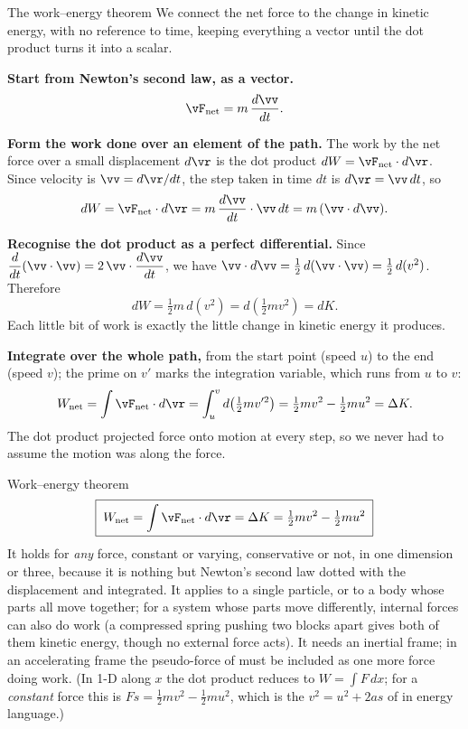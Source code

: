 \begin{derivbox}{The work--energy theorem}
We connect the net force to the change in kinetic energy, with no reference to time, keeping everything
a vector until the dot product turns it into a scalar.

 \textbf{Start from Newton's second law, as a vector.}
\[
\vF_{\text{net}}=m\,\frac{d\vv}{dt}.
\]

 \textbf{Form the work done over an element of the path.} The work by the net force over a small
displacement $d\vr$ is the dot product $dW=\vF_{\text{net}}\cdot d\vr$. Since velocity is $\vv=d\vr/dt$,
the step taken in time $dt$ is $d\vr=\vv\,dt$, so
\[
dW=\vF_{\text{net}}\cdot d\vr=m\,\frac{d\vv}{dt}\cdot\vv\,dt=m\,(\vv\cdot d\vv).
\]

 \textbf{Recognise the dot product as a perfect differential.} Since
$\dfrac{d}{dt}(\vv\cdot\vv)=2\,\vv\cdot\dfrac{d\vv}{dt}$, we have $\vv\cdot d\vv=\tfrac12\,d(\vv\cdot\vv)
=\tfrac12\,d(v^2)$. Therefore
\[
dW=\tfrac12 m\,d(v^2)=d\!\left(\tfrac12 m v^2\right)=dK.
\]
Each little bit of work is exactly the little change in kinetic energy it produces.

 \textbf{Integrate over the whole path,} from the start point (speed $u$) to the end (speed $v$);
the prime on $v'$ marks the integration variable, which runs from $u$ to $v$:
\[
W_{\text{net}}=\int \vF_{\text{net}}\cdot d\vr=\int_{u}^{v} d\!\left(\tfrac12 m v'^2\right)
=\tfrac12 m v^2-\tfrac12 m u^2=\Delta K.
\]
The dot product projected force onto motion at every step, so we never had to assume the motion was
along the force.
\end{derivbox}

\begin{keybox}{Work--energy theorem}
\[
\boxed{\;W_{\text{net}}=\int\vF_{\text{net}}\cdot d\vr=\Delta K=\tfrac12 mv^2-\tfrac12 mu^2\;}
\]
It holds for \emph{any} force, constant or varying, conservative or not, in one dimension or three,
because it is nothing but Newton's second law dotted with the displacement and integrated. It applies to
a single particle, or to a body whose parts all move together; for a system whose parts move differently,
internal forces can also do work (a compressed spring pushing two blocks apart gives both of them kinetic
energy, though no external force acts). It needs an inertial frame; in an accelerating frame the
pseudo-force of  must be included as one more force doing work. (In 1-D along $x$
the dot product reduces to $W=\int F\,dx$; for a \emph{constant} force this is
$Fs=\tfrac12mv^2-\tfrac12mu^2$, which is the $v^2=u^2+2as$ of  in energy
language.)
\end{keybox}

